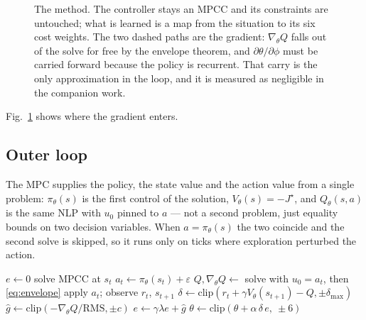 \documentclass[letterpaper, 10 pt, conference]{ieeeconf}
\begin{document}
\begin{figure}[t]
  \caption{The method. The controller stays an MPCC and its constraints are
  untouched; what is learned is a map from the situation to its six cost
  weights. The two dashed paths are the gradient: $\nabla_\theta Q$ falls out of
  the solve for free by the envelope theorem, and $\partial\theta/\partial\phi$
  must be carried forward because the policy is recurrent. That carry is the
  only approximation in the loop, and it is measured as negligible in the
  companion work.}
  \label{fig:arch}
\end{figure}

Fig.~\ref{fig:arch} shows where the gradient enters.

\subsection{Outer loop}
The MPC supplies the policy, the state value and the action value from a single
problem: $\pi_\theta(s)$ is the first control of the solution, $V_\theta(s) =
-J^\star$, and $Q_\theta(s,a)$ is the same NLP with $u_0$ pinned to $a$ --- not
a second problem, just equality bounds on two decision variables. When
$a = \pi_\theta(s)$ the two coincide and the second solve is skipped, so it runs
only on ticks where exploration perturbed the action.

\begin{algorithm}[t]
\caption{TD($\lambda$) on the cost weights, one update per control tick}
\label{alg:tdlambda}
\begin{algorithmic}[1]
\State $e \gets 0$
  \State solve MPCC at $s_t$ 
  \State $a_t \gets \pi_\theta(s_t) + \varepsilon$ 
  \State $Q, \nabla_\theta Q \gets$ solve with $u_0 = a_t$, then \eqref{eq:envelope}
  \State apply $a_t$; observe $r_t$, $s_{t+1}$
  \State $\delta \gets \mathrm{clip}\!\left(r_t + \gamma V_\theta(s_{t+1}) - Q, \pm\delta_{\max}\right)$
  \State $\hat g \gets \mathrm{clip}\!\left(-\nabla_\theta Q / \mathrm{RMS}, \pm c\right)$
  \State $e \gets \gamma\lambda e + \hat g$
  \State $\theta \gets \mathrm{clip}\!\left(\theta + \alpha\,\delta\,e,\ \pm 6\right)$
\EndFor
\end{algorithmic}
\end{algorithm}
\end{document}
